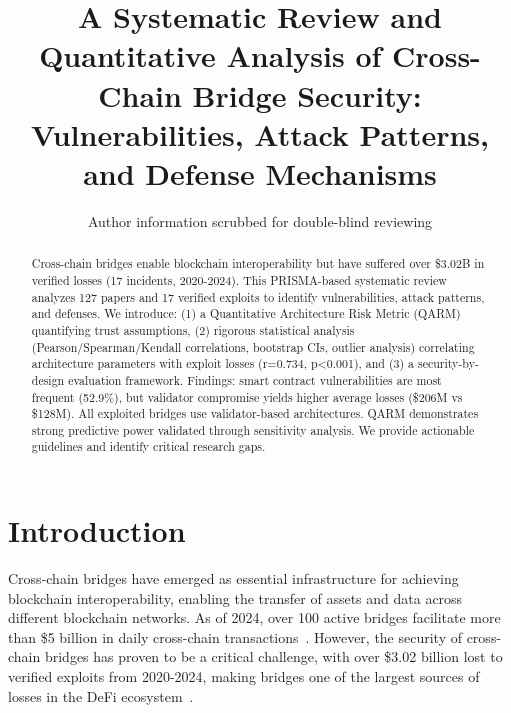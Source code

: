 \documentclass[runningheads]{llncs}
\begin{document}
\title{A Systematic Review and Quantitative Analysis of Cross-Chain Bridge Security:\\
Vulnerabilities, Attack Patterns, and Defense Mechanisms}

\author{Author information scrubbed for double-blind reviewing}

\maketitle

\begin{abstract}
Cross-chain bridges enable blockchain interoperability but have suffered over \$3.02B in verified losses (17 incidents, 2020-2024). This PRISMA-based systematic review analyzes 127 papers and 17 verified exploits to identify vulnerabilities, attack patterns, and defenses. We introduce: (1) a Quantitative Architecture Risk Metric (QARM) quantifying trust assumptions, (2) rigorous statistical analysis (Pearson/Spearman/Kendall correlations, bootstrap CIs, outlier analysis) correlating architecture parameters with exploit losses (r=0.734, p<0.001), and (3) a security-by-design evaluation framework. Findings: smart contract vulnerabilities are most frequent (52.9\%), but validator compromise yields higher average losses (\$206M vs \$128M). All exploited bridges use validator-based architectures. QARM demonstrates strong predictive power validated through sensitivity analysis. We provide actionable guidelines and identify critical research gaps.
\end{abstract}


\vspace{-0.3cm}
\section{Introduction}

Cross-chain bridges have emerged as essential infrastructure for achieving blockchain interoperability, enabling the transfer of assets and data across different blockchain networks. As of 2024, over 100 active bridges facilitate more than \$5 billion in daily cross-chain transactions~\cite{defillama2024}. However, the security of cross-chain bridges has proven to be a critical challenge, with over \$3.02 billion lost to verified exploits from 2020-2024, making bridges one of the largest sources of losses in the DeFi ecosystem~\cite{rekt2024}.
\end{document}
